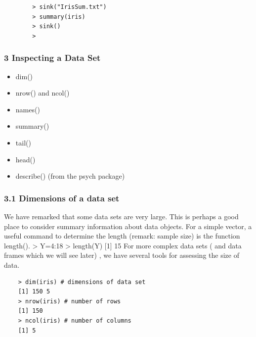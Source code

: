\documentclass{beamer}
\begin{document}
	\begin{frame}[fragile]
	\begin{framed}
	\begin{verbatim}
		> sink("IrisSum.txt")
		> summary(iris)
		> sink()
		>
	\end{verbatim}
	\end{framed}	
	\end{frame}

\begin{frame}
	\frametitle{3 Inspecting a Data Set}
	\begin{itemize}
		\item dim()
		\item nrow() and ncol()
		\item names()
		\item summary()
		\item tail()
		\item head()
		\item describe() (from the psych package)
	\end{itemize}
\end{frame}
\begin{frame}
	
	\frametitle{3.1 Dimensions of a data set}
	We have remarked that some data sets are very large. This is perhaps a good place to consider
	summary information about data objects. For a simple vector, a useful command to determine
	the length (remark: sample size) is the function length().
	> Y=4:18
	> length(Y)
	[1] 15
	For more complex data sets ( and data frames which we will see later) , we have several
	tools for assessing the size of data.
\end{frame}
\begin{frame}[fragile]
	\begin{verbatim}
	> dim(iris) # dimensions of data set
	[1] 150 5
	> nrow(iris) # number of rows
	[1] 150
	> ncol(iris) # number of columns
	[1] 5
	\end{verbatim}
	
\end{frame}
\end{document}
